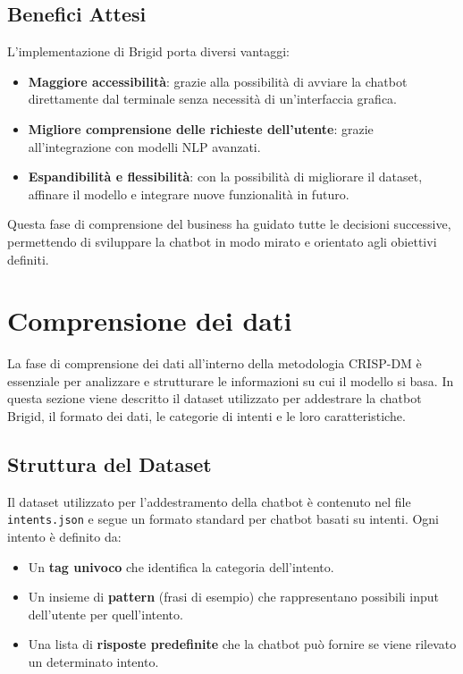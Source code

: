 \documentclass[12pt, letterpaper]{article}
\begin{document}
\subsection{Benefici Attesi}
L’implementazione di Brigid porta diversi vantaggi:
\begin{itemize}	\item \textbf{Maggiore accessibilità}: grazie alla possibilità di avviare la chatbot direttamente dal terminale senza necessità di un’interfaccia grafica.
\item \textbf{Migliore comprensione delle richieste dell’utente}: grazie all’integrazione con modelli NLP avanzati.
\item \textbf{Espandibilità e flessibilità}: con la possibilità di migliorare il dataset, affinare il modello e integrare nuove funzionalità in futuro.
\end{itemize}
Questa fase di comprensione del business ha guidato tutte le decisioni successive, permettendo di sviluppare la chatbot in modo mirato e orientato agli obiettivi definiti.

\newpage
\section{Comprensione dei dati}
La fase di comprensione dei dati all’interno della metodologia CRISP-DM è essenziale per analizzare e strutturare le informazioni su cui il modello si basa. In questa sezione viene descritto il dataset utilizzato per addestrare la chatbot Brigid, il formato dei dati, le categorie di intenti e le loro caratteristiche.

\subsection{Struttura del Dataset}
Il dataset utilizzato per l’addestramento della chatbot è contenuto nel file \texttt{intents.json} e segue un formato standard per chatbot basati su intenti. Ogni intento è definito da:
\begin{itemize}
	\item Un \textbf{tag univoco} che identifica la categoria dell’intento.
	\item Un insieme di \textbf{pattern} (frasi di esempio) che rappresentano possibili input dell’utente per quell’intento.
	\item Una lista di \textbf{risposte predefinite} che la chatbot può fornire se viene rilevato un determinato intento.
\end{itemize}
\end{document}
